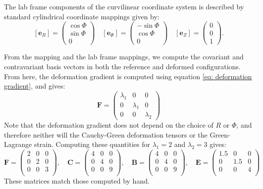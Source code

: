 \documentclass[]{spie}  %
\begin{document}
The lab frame components of the curvilinear coordinate system is described by standard cylindrical coordinate mappings given by:
\[
[\bm{e}_R] = \begin{pmatrix} \cos\Phi \\ \sin\Phi \\ 0 \end{pmatrix}
\quad
[\bm{e}_\Phi] = \begin{pmatrix} -\sin\Phi \\ \cos\Phi \\ 0 \end{pmatrix}
\quad
[\bm{e}_Z] = \begin{pmatrix} 0\\ 0\\ 1 \end{pmatrix}.
\]

From the mapping and the lab frame mappings, we compute the covariant and contravariant basis vectors in both the reference and deformed configurations. From here, the deformation gradient is computed using equation \ref{eq: deformation gradient}, and gives:
\[
\bm{F} = 
\begin{pmatrix} 
\lambda_1 & 0 & 0 \\
0 & \lambda_1 & 0 \\
0 & 0 & \lambda_2
\end{pmatrix}
\]
Note that the deformation gradient does not depend on the choice of $R$ or $\Phi$, and therefore neither will the Cauchy-Green deformation tensors or the Green-Lagrange strain. Computing these quantities for $\lambda_1 = 2$ and $\lambda_2 = 3$ gives: 
\[
\bm{F} = 
\begin{pmatrix} 
2 & 0 & 0 \\
0 & 2 & 0 \\
0 & 0 & 3 \\
\end{pmatrix}
, \quad 
\bm{C} = 
\begin{pmatrix} 
4 & 0 & 0 \\
0 & 4 & 0 \\
0 & 0 & 9 \\
\end{pmatrix}
, \quad 
\bm{B} = 
\begin{pmatrix} 
4 & 0 & 0 \\
0 & 4 & 0 \\
0 & 0 & 9 \\
\end{pmatrix}
, \quad 
\bm{E} = 
\begin{pmatrix} 
1.5 & 0 & 0 \\
0 & 1.5 & 0 \\
0 & 0 & 4 \\
\end{pmatrix}
\]
These matrices match those computed by hand.
\end{document}
